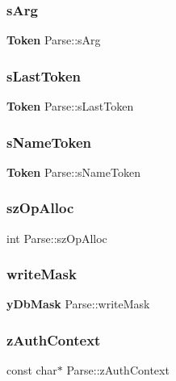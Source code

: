 \subsubsection{sArg}
{\footnotesize\ttfamily \textbf{ Token} Parse\+::s\+Arg}

\mbox{\label{struct_parse_ad499020d1bf06f3c98c8d36e2ceb83fd}} 
\subsubsection{sLastToken}
{\footnotesize\ttfamily \textbf{ Token} Parse\+::s\+Last\+Token}

\mbox{\label{struct_parse_afd929c54566cfc4d6f748fcc6b79b973}} 
\subsubsection{sNameToken}
{\footnotesize\ttfamily \textbf{ Token} Parse\+::s\+Name\+Token}

\mbox{\label{struct_parse_af9d073fc2f41afbe5a2f1c580f2333c9}} 
\subsubsection{szOpAlloc}
{\footnotesize\ttfamily int Parse\+::sz\+Op\+Alloc}

\mbox{\label{struct_parse_a4939b6d4fd3f48731b58b8a6f51417cd}} 
\subsubsection{writeMask}
{\footnotesize\ttfamily \textbf{ y\+Db\+Mask} Parse\+::write\+Mask}

\mbox{\label{struct_parse_a12c6e2fb69848bcc57169d44993c351f}} 
\subsubsection{zAuthContext}
{\footnotesize\ttfamily const char$\ast$ Parse\+::z\+Auth\+Context}

\mbox{\label{struct_parse_a04146757986ff4654c7b321654896e81}} 
